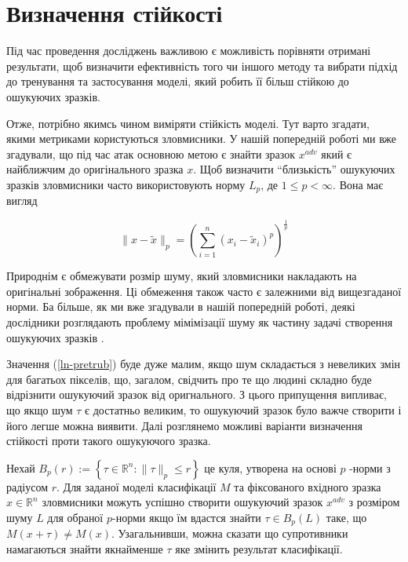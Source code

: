 \documentclass[14pt,a4paper]{extarticle}
\newcounter{e}
\numberwithin{equation}{section}
\numberwithin{figure}{section}
\begin{document}
 
 
 \newpage
 \thispagestyle{empty}
 \section{Визначення стійкості}
 \vspace{1cm}
 Під час проведення досліджень важливою є можливість порівняти отримані результати, щоб визначити ефективність того чи іншого методу та вибрати підхід до тренування та застосування моделі, який робить її більш стійкою до ошукуючих зразків.
 
 Отже, потрібно якимсь чином виміряти стійкість моделі. Тут варто згадати, якими метриками користуються зловмисники. У нашій попередній роботі \cite{my-work} ми вже згадували, що під час атак основною метою є знайти зразок $x^{adv}$ який є найближчим до оригінального зразка $x$. Щоб визначити ``близькість'' ошукуючих зразків зловмисники часто використовують норму  $L_p$, де $1 \leq p<\infty$. Вона має вигляд
 
 \begin{equation}
 \label{ln-pretrub}
 \|x-\tilde{x}\|_{p}=\left(\sum_{i=1}^{n}\left(x_{i}-\tilde{x}_{i}\right)^{p}\right)^{\frac{1}{p}}
 \end{equation}
 
 Природнім є обмежувати розмір шуму, який зловмисники накладають на оригінальні зображення. Ці обмеження також часто є залежними від вищезгаданої норми. Ба більше, як ми вже згадували в нашій попередній роботі, деякі дослідники розглядають проблему мімімізації шуму як частину задачі створення ошукуючих зразків \cite{C-and-W}.
 
 Значення (\ref{ln-pretrub}) буде дуже малим, якщо шум складається з невеликих змін для багатьох пікселів, що, загалом, свідчить про те що людині складно буде відрізнити ошукуючий зразок від оригнального. З цього припущення випливає, що якщо шум $\tau$ є достатньо великим, то ошукуючий зразок було важче створити і його легше можна виявити.
 Далі розглянемо можливі варіанти визначення стійкості проти такого ошукуючого зразка.
 
 Нехай $B_{p}(r):=\left\{\tau \in \mathbb{R}^{n}:\|\tau\|_{p} \leq r\right\}$ це куля, утворена на основі $p$ -норми з радіусом $r$. Для заданої моделі класифікації $M$ та фіксованого вхідного зразка $x \in \mathbb{R}^{n}$ зловмисники можуть успішно створити ошукуючий зразок $x^{adv}$ з розміром шуму $L$ для обраної $p$-норми якщо їм вдастся знайти $\tau \in B_{p}(L)$ таке, що $M(x+\tau) \neq M(x)$. Узагальнивши, можна сказати що супротивники намагаються знайти якнайменше $\tau$ яке змінить результат класифікації.
 
\end{document}

